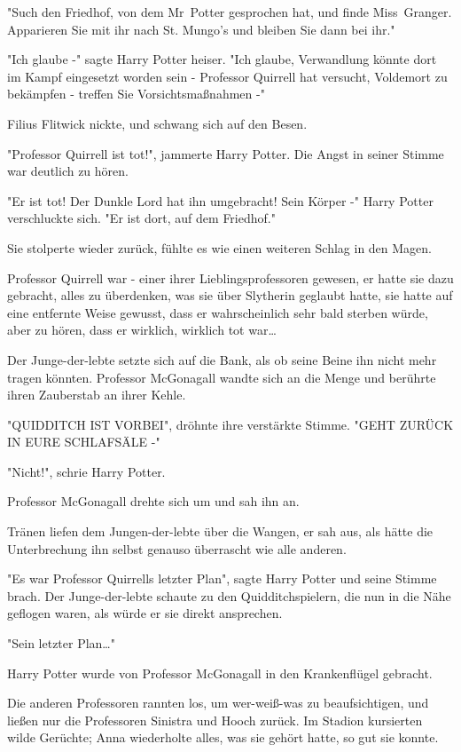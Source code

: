 {"Such den Friedhof, von dem Mr~Potter gesprochen hat, und finde Miss~Granger. Apparieren Sie mit ihr nach St. Mungo's und bleiben Sie dann bei ihr."

"Ich glaube -" sagte Harry Potter heiser. "Ich glaube, Verwandlung könnte dort im Kampf eingesetzt worden sein - Professor Quirrell hat versucht, Voldemort zu bekämpfen - treffen Sie Vorsichtsmaßnahmen -"

Filius Flitwick nickte, und schwang sich auf den Besen.

"Professor Quirrell ist tot!", jammerte Harry Potter. Die Angst in seiner Stimme war deutlich zu hören.

"Er ist tot! Der Dunkle Lord hat ihn umgebracht! Sein Körper -" Harry Potter verschluckte sich. "Er ist dort, auf dem Friedhof."

Sie stolperte wieder zurück, fühlte es wie einen weiteren Schlag in den Magen.

Professor Quirrell war - einer ihrer Lieblingsprofessoren gewesen, er hatte sie dazu gebracht, alles zu überdenken, was sie über Slytherin geglaubt hatte, sie hatte auf eine entfernte Weise gewusst, dass er wahrscheinlich sehr bald sterben würde, aber zu hören, dass er wirklich, wirklich tot war…

Der Junge-der-lebte setzte sich auf die Bank, als ob seine Beine ihn nicht mehr tragen könnten. Professor McGonagall wandte sich an die Menge und berührte ihren Zauberstab an ihrer Kehle.

"QUIDDITCH IST VORBEI", dröhnte ihre verstärkte Stimme. "GEHT ZURÜCK IN EURE SCHLAFSÄLE -"

"Nicht!", schrie Harry Potter.

Professor McGonagall drehte sich um und sah ihn an.

Tränen liefen dem Jungen-der-lebte über die Wangen, er sah aus, als hätte die Unterbrechung ihn selbst genauso überrascht wie alle anderen.

"Es war Professor Quirrells letzter Plan", sagte Harry Potter und seine Stimme brach. Der Junge-der-lebte schaute zu den Quidditchspielern, die nun in die Nähe geflogen waren, als würde er sie direkt ansprechen.

"Sein letzter Plan…"

Harry Potter wurde von Professor McGonagall in den Krankenflügel gebracht.

Die anderen Professoren rannten los, um wer-weiß-was zu beaufsichtigen, und ließen nur die Professoren Sinistra und Hooch zurück. Im Stadion kursierten wilde Gerüchte; Anna wiederholte alles, was sie gehört hatte, so gut sie konnte.

}
